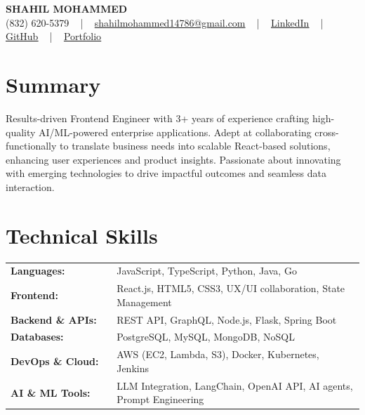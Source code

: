 \documentclass[letterpaper,11pt]{article}
\begin{document}
\begin{center}
    {\fontsize{14pt}{12pt}\selectfont \textbf{\MakeUppercase{Shahil Mohammed}}}\\ \vspace{2pt}
    \fontsize{10pt}{12pt}\selectfont (832) 620-5379 ~ | ~ \href{mailto:shahilmohammed14786@gmail.com}{shahilmohammed14786@gmail.com} ~ | ~  
    \href{https://www.linkedin.com/in/shahil-mohammed-9652931a1/}{\color{blue}\underline{LinkedIn}}  ~ | ~ 
    \href{https://github.com/freakbeast14}{\color{blue}\underline{GitHub}} ~ | ~ 
    \href{https://shahil-mohammed.netlify.app/}{\color{blue}\underline{Portfolio}}
    \vspace{-8pt}
\end{center}

\section{Summary}
\fontsize{9pt}{10pt}\selectfont
Results-driven Frontend Engineer with 3+ years of experience crafting high-quality AI/ML-powered enterprise applications. Adept at collaborating cross-functionally to translate business needs into scalable React-based solutions, enhancing user experiences and product insights. Passionate about innovating with emerging technologies to drive impactful outcomes and seamless data interaction.
 \vspace{-5pt}
 
\section{Technical Skills}
        \vspace{-14pt}
        \begin{table}[h]
            \fontsize{9pt}{10pt}\selectfont
            \begin{tabular}{p{0.3\linewidth} p{0.7\linewidth}}
                \textbf{Languages:} & JavaScript, TypeScript, Python, Java, Go \\
                \textbf{Frontend:} & React.js, HTML5, CSS3, UX/UI collaboration, State Management \\
                \textbf{Backend \& APIs:} & REST API, GraphQL, Node.js, Flask, Spring Boot \\
                \textbf{Databases:} & PostgreSQL, MySQL, MongoDB, NoSQL \\
                \textbf{DevOps \& Cloud:} & AWS (EC2, Lambda, S3), Docker, Kubernetes, Jenkins \\
                \textbf{AI \& ML Tools:} & LLM Integration, LangChain, OpenAI API, AI agents, Prompt Engineering \\
            \end{tabular}
        \end{table}
 \vspace{-15pt}
 
\end{document}
